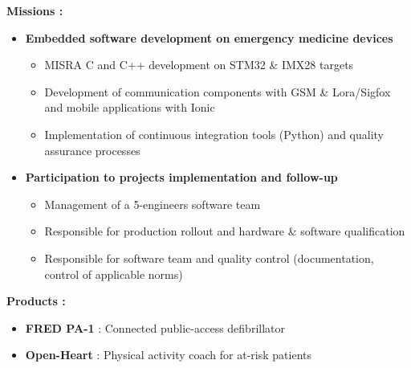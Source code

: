 {\begin{itemize}[leftmargin=\ListItemsMargins]
	\end{itemize}
\else
	\textcolor{color1}{\textbf{Missions :}}
	\begin{itemize}[leftmargin=\ListItemsMargins]
		\item \textbf{Embedded software development on emergency medicine devices}
		\begin{itemize}
			\item MISRA C and C++ development on STM32 \& IMX28 targets
			\item Development of communication components with GSM \& Lora/Sigfox and mobile applications with Ionic
			\item Implementation of continuous integration tools (Python) and quality assurance processes
		\end{itemize}
		\item \textbf{Participation to projects implementation and follow-up}
		\begin{itemize}
			\ifaddmngt \item Management of a 5-engineers software team \fi
			\item Responsible for production rollout and hardware \& software qualification
			\item Responsible for software team and quality control (documentation, control of applicable norms)
		\end{itemize}
	\end{itemize}
	\textcolor{color1}{\textbf{Products :}}
	\begin{itemize}[leftmargin=\ListItemsMargins]
		\item \textbf{FRED PA-1} : Connected public-access defibrillator \textcolor{color1}{\href{http://www.schiller.ch/corp/en/product/fred-pa-1}{\ExternalLink}}
		\item \textbf{Open-Heart} : Physical activity coach for at-risk patients \textcolor{color1}{\href{http://www.schiller.ch/corp/en/schiller-cutting-edge-connected-health}{\ExternalLink}}
	\end{itemize}
\fi
}



\vspace{\ItemsMaxSpacing}

